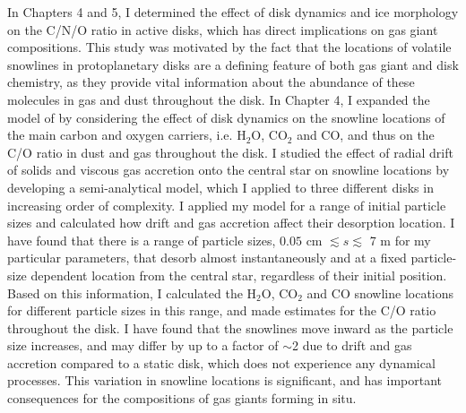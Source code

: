 In Chapters 4 and 5, I determined the effect of disk dynamics and ice morphology on the C/N/O ratio in active disks, which has direct implications on gas giant compositions. This study was motivated by the fact that the locations of volatile snowlines in protoplanetary disks are a defining feature of both gas giant and disk chemistry, as they provide vital information about the abundance of these molecules in gas and dust throughout the disk. In Chapter 4, I expanded the model of \citet{oberg11} by considering the effect of disk dynamics on the snowline locations of the main carbon and oxygen carriers, i.e. H$_2$O, CO$_2$ and CO, and thus on the C/O ratio in dust and gas throughout the disk. I studied the effect of radial drift of solids and viscous gas accretion onto the central star on snowline locations by developing a semi-analytical model, which I applied to three different disks in increasing order of complexity. I applied my model for a range of initial particle sizes and calculated how drift and gas accretion affect their desorption location. I have found that there is a range of particle sizes, $0.05$ cm $\lesssim s \lesssim$ 7 m for my particular parameters, that desorb almost instantaneously and at a fixed particle-size dependent location from the central star, regardless of their initial position. Based on this information, I calculated the H$_2$O, CO$_2$ and CO snowline locations for different particle sizes in this range, and made estimates for the C/O ratio throughout the disk. I have found that the snowlines move inward as the particle size increases, and may differ by up to a factor of $\sim$2 due to drift and gas accretion compared to a static disk, which does not experience any dynamical processes. This variation in snowline locations is significant, and has important consequences for the compositions of gas giants forming in situ. 

